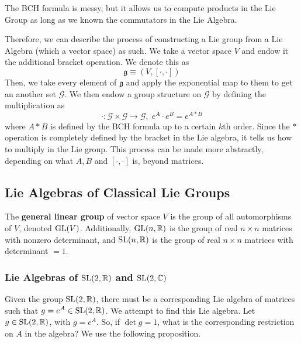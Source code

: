   The BCH formula is messy, but it allows us to compute products in the Lie Group as long as we known the commutators in the Lie Algebra. 

  Therefore, we can describe the process of constructing a Lie group from a Lie Algebra (which a vector space) as such. We take a vector space $V$ and endow it the additional bracket operation. We denote this as
  \begin{equation}
    \mathfrak{g} \equiv (V, [\cdot, \cdot])
  \end{equation}
  Then, we take every element of $\mathfrak{g}$ and apply the exponential map to them to get an another set $\mathcal{G}$. We then endow a group structure on $\mathcal{G}$ by defining the multiplication as 
  \begin{equation}
    \cdot: \mathcal{G} \times \mathcal{G} \rightarrow \mathcal{G}, \; e^A \cdot e^B = e^{A * B}
  \end{equation}
  where $A*B$ is defined by the BCH formula up to a certain $k$th order. Since the $*$ operation is completely defined by the bracket in the Lie algebra, it tells us how to multiply in the Lie group. This process can be made more abstractly, depending on what $A, B$ and $[\cdot,\cdot]$ is, beyond matrices. 

\subsection{Lie Algebras of Classical Lie Groups}

  \begin{definition}
    The \textbf{general linear group} of vector space $V$ is the group of all automorphisms of $V$, denoted $\operatorname{GL}(V)$. Additionally, $\operatorname{GL}(n, \mathbb{R})$ is the group of real $n \times n$ matrices with nonzero determinant, and $\operatorname{SL}(n, \mathbb{R})$ is the group of real $n \times n$ matrices with determinant $= 1$.
  \end{definition}

  \subsubsection[Lie Algebras of SL(2, R) and SL(2, C)]{Lie Algebras of $\operatorname{SL}(2, \mathbb{R})$ and $\operatorname{SL}(2, \mathbb{C})$}

    Given the group $\operatorname{SL}(2, \mathbb{R})$, there must be a corresponding Lie algebra of matrices such that $g = e^A \in \operatorname{SL}(2, \mathbb{R})$. We attempt to find this Lie algebra. Let $g \in \operatorname{SL}(2, \mathbb{R})$, with $g = e^A$. So, if $\det{g} = 1$, what is the corresponding restriction on $A$ in the algebra? We use the following proposition. 

